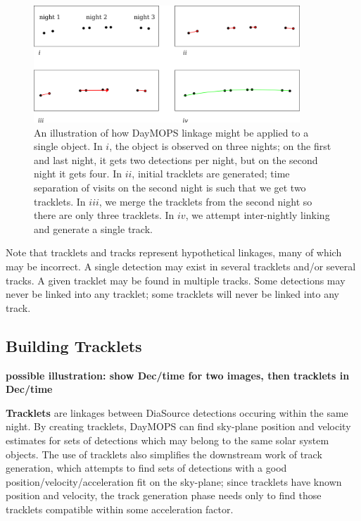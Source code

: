 \begin{figure}[ht]
  \centering
    \includegraphics[width=10cm]{illustrations/oneObjectMops.png}
    \caption{ An illustration of how DayMOPS linkage might be applied
      to a single object.  In $i$, the object is observed on three
      nights; on the first and last night, it gets two detections per
      night, but on the second night it gets four.  In $ii$, initial
      tracklets are generated; time separation of visits on the second
      night is such that we get two tracklets.  In $iii$, we merge the
      tracklets from the second night so there are only three
      tracklets.  In $iv$, we attempt inter-nightly linking and
      generate a single track.}
\label{objectPlotted}
\end{figure}


Note that tracklets and tracks represent hypothetical linkages, many
of which may be incorrect.  A single detection may exist in several
tracklets and/or several tracks.  A given tracklet may be found in
multiple tracks.  Some detections may never be linked into any
tracklet; some tracklets will never be linked into any track.  





\subsection{Building Tracklets}

\textbf{ possible illustration: show Dec/time for two images, then tracklets in Dec/time}

\textbf{Tracklets} are linkages between DiaSource detections occuring
within the same night. By creating tracklets, DayMOPS can find
sky-plane position and velocity estimates for sets of detections which
may belong to the same solar system objects.  The use of tracklets
also simplifies the downstream work of track generation, which
attempts to find sets of detections with a good
position/velocity/acceleration fit on the sky-plane; since tracklets
have known position and velocity, the track generation phase needs
only to find those tracklets compatible within some acceleration
factor.

